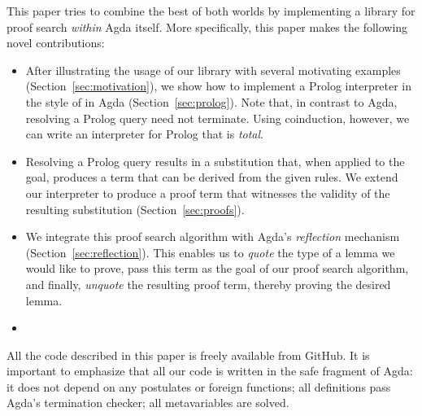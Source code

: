 \documentclass[preprint]{sigplanconf}
\begin{document}
This paper tries to combine the best of both worlds by implementing
a library for proof search \emph{within} Agda itself. More specifically,
this paper makes the following novel contributions:

\begin{itemize}
\item %
  After illustrating the usage of our library with several motivating
  examples (Section~\ref{sec:motivation}), we show how to implement a
  Prolog interpreter in the style of \citet{stutterheim} in Agda
  (Section~\ref{sec:prolog}). Note that, in contrast to Agda,
  resolving a Prolog query need not terminate. Using coinduction,
  however, we can write an interpreter for Prolog that is \emph{total}.
\item %
  Resolving a Prolog query results in a substitution that, when applied
  to the goal, produces a term that can be derived from the given
  rules. We extend our interpreter to produce a proof term that
  witnesses the validity of the resulting substitution
  (Section~\ref{sec:proofs}).
\item %
  We integrate this proof search algorithm with Agda's
  \emph{reflection} mechanism (Section~\ref{sec:reflection}). This
  enables us to \emph{quote} the type of a lemma we would like to
  prove, pass this term as the goal of our proof search algorithm, and
  finally, \emph{unquote} the resulting proof term, thereby proving
  the desired lemma.
\item %
   
\end{itemize}

All the code described in this paper is freely available from
GitHub. It is important to emphasize that all our code
is written in the safe fragment of Agda: it does not depend on any
postulates or foreign functions; all definitions pass Agda's
termination checker; all metavariables are solved.
\end{document}
